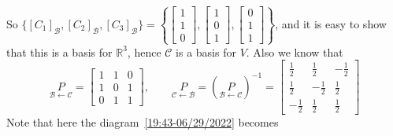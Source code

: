 \documentclass{beamer}
\DeclareMathOperator{\id}{id}
\theoremstyle{definition}
\theoremstyle{remark}
\begin{document}
\begin{frame}[t]
\begin{example}
So $\{[C_1]_{\mathcal B},[C_2]_{\mathcal B},[C_3]_{\mathcal B}\}=\left\{\begin{bmatrix}
1\\1\\0
\end{bmatrix},\begin{bmatrix}
1\\0\\1
\end{bmatrix},\begin{bmatrix}
0\\1\\1
\end{bmatrix}\right\}$\pause, and it is easy to show that this is a basis for $\mathbb R^3$\pause, hence $\mathcal C$ is a basis for $V$. Also we know that\pause
\[
\underset{\mathcal B\leftarrow\mathcal C}{P}=\begin{bmatrix}
1&1&0\\
1&0&1\\
0&1&1
\end{bmatrix},\qquad
\underset{\mathcal C\leftarrow\mathcal B}{P}=\left(\underset{\mathcal B\leftarrow\mathcal C}{P}\right)^{-1}=\begin{bmatrix}
\frac{1}{2}&\frac{1}{2}&-\frac{1}{2}\\
\frac{1}{2}&-\frac{1}{2}&\frac{1}{2}\\
-\frac{1}{2}&\frac{1}{2}&\frac{1}{2}
\end{bmatrix}
\]
Note that here the diagram~\eqref{19:43-06/29/2022} becomes\pause
\vspace{-4mm}
\begin{center}
\end{center}
\end{example}
\end{frame}
\end{document}
